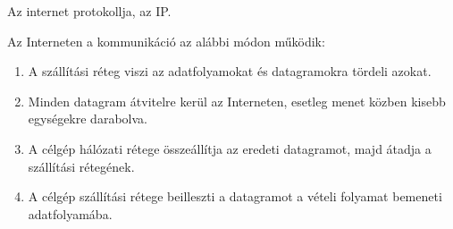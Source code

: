 \documentclass[margin=0px]{article}
\begin{document}
\begin{description}
        Az internet protokollja, az IP.

        Az Interneten a kommunikáció az alábbi módon működik:
        \begin{enumerate}
            \item A szállítási réteg viszi az adatfolyamokat és datagramokra tördeli azokat.
            \item Minden datagram átvitelre kerül az Interneten, esetleg menet közben kisebb egységekre darabolva.
            \item A célgép hálózati rétege összeállítja az eredeti datagramot, majd átadja a szállítási rétegének.
            \item A célgép szállítási rétege beilleszti a datagramot a vételi folyamat bemeneti adatfolyamába.
        \end{enumerate}


\end{description}
\end{document}
